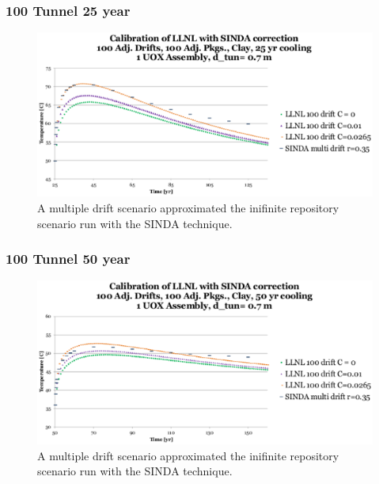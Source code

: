 \begin{frame}[ctb!]
  \frametitle{100 Tunnel 25 year}
  \begin{figure}[h]
    \begin{center}
      \includegraphics[width=.8\textwidth]{100drift25yr.eps}
      \caption{A multiple drift scenario approximated the inifinite repository 
      scenario run with the SINDA technique.}
    \end{center}
    \label{fig:100drift25yr}
  \end{figure}
  
\end{frame}
\begin{frame}[ctb!]

  \frametitle{100 Tunnel 50 year}
  \begin{figure}[h]
    \begin{center}
      \includegraphics[width=.8\textwidth]{100drift50yr.eps}
      \caption{A multiple drift scenario approximated the inifinite repository 
      scenario run with the SINDA technique.}
    \end{center}
    \label{fig:100drift50yr}
  \end{figure}
  
\end{frame}

